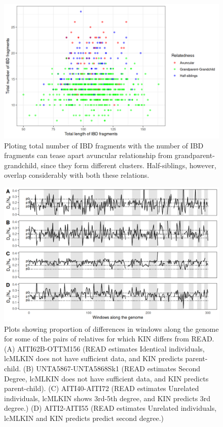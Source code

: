 \documentclass[12pt, letterpaper]{article}
\begin{document}
\begin{figure}[h!]
    \centering
    \includegraphics[width=18cm]{supplementary_info/plots/degree2_10Mwin.png}
    \caption{Ploting total number of IBD fragments with the number of IBD fragments can tease apart avuncular relationship from grandparent-grandchild, since they form different clusters. Half-siblings, however, overlap considerably with both these relations.}
    \label{figS7:second_degree}
\end{figure}


\begin{figure}[!ht]
    \centering
    \includegraphics[width=18cm]{supplementary_info/plots/egplot1.png}
    \caption{Plots showing proportion of differences in windows along the genome for some of the pairs of relatives for which KIN differs from READ. (A) AITI62B-OTTM156 (READ estimates Identical individuals, lcMLKIN does not have sufficient data, and KIN predicts parent-child. (B) UNTA5867-UNTA5868Sk1 (READ estimates Second Degree, lcMLKIN does not have sufficient data, and KIN predicts parent-child). (C) AITI40-AITI72 (READ estimates Unrelated individuals, lcMLKIN shows 3rd-5th degree, and KIN predicts 3rd degree.)
    (D) AITI2-AITI55 (READ estimates Unrelated individuals, lcMLKIN and KIN predicts predict second degree.)}
    \label{figS8:eg1}
\end{figure}
\end{document}
